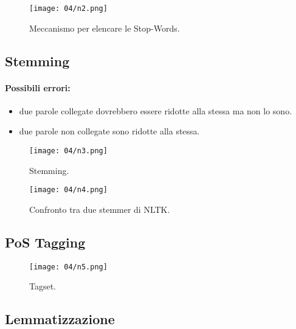\begin{figure}[h]
    \centering
    \texttt{[image: 04/n2.png]}
    \caption{Meccanismo per elencare le Stop-Words.}
\end{figure}

\subsection{Stemming}



\paragraph{Possibili errori:}

\begin{itemize}
  \item {} due parole collegate dovrebbero essere ridotte alla stessa ma non lo sono. 
  \item {} due parole non collegate sono ridotte alla stessa.
\end{itemize}

\begin{figure}[h]
    \centering
    \texttt{[image: 04/n3.png]}
    \caption{Stemming.}
\end{figure}

\begin{figure}[h]
    \centering
    \texttt{[image: 04/n4.png]}
    \caption{Confronto tra due stemmer di NLTK.}
\end{figure}

\subsection{PoS Tagging}


\begin{figure}[h]
    \centering
    \texttt{[image: 04/n5.png]}
    \caption{Tagset.}
\end{figure}

\subsection{Lemmatizzazione}

